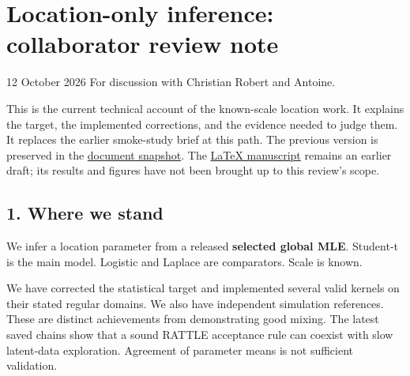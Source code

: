\documentclass[
  10pt,
]{article}
\author{}
\date{}
\begin{document}
\section{Location-only inference: collaborator review
note}\label{location-only-inference-collaborator-review-note}

12 October 2026 \textperiodcentered{} For discussion with Christian Robert and Antoine.

This is the current technical account of the known-scale location work.
It explains the target, the implemented corrections, and the evidence
needed to judge them. It replaces the earlier smoke-study brief at this
path. The previous version is preserved in the
\href{evidence/location_review_handoff_2026-10-12/documents_before.tar.gz}{document
snapshot}. The \href{../paper/paper.tex}{LaTeX manuscript} remains an
earlier draft; its results and figures have not been brought up to this
review's scope.

\subsection{1. Where we stand}\label{where-we-stand}

We infer a location parameter from a released \textbf{selected global
MLE}. Student-t is the main model. Logistic and Laplace are comparators.
Scale is known.

We have corrected the statistical target and implemented several valid
kernels on their stated regular domains. We also have independent
simulation references. These are distinct achievements from
demonstrating good mixing. The latest saved chains show that a sound
RATTLE acceptance rule can coexist with slow latent-data exploration.
Agreement of parameter means is not sufficient validation.
\end{document}
